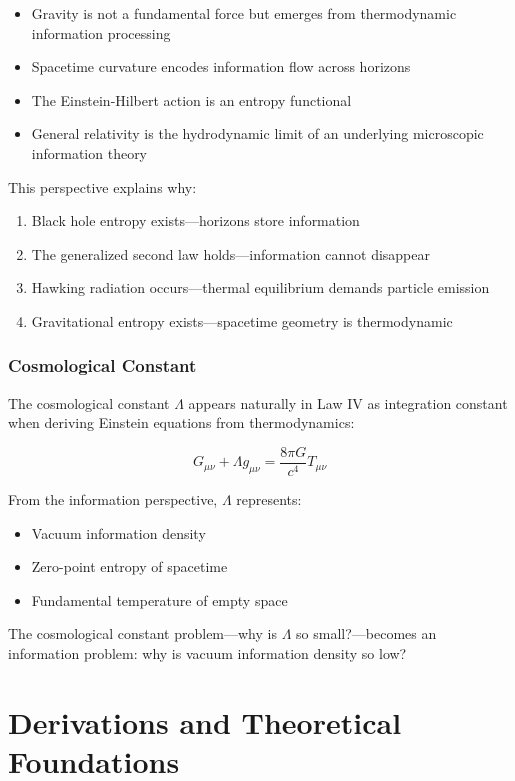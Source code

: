 \documentclass[11pt,a4paper]{article}
\theoremstyle{plain}
\theoremstyle{definition}
\theoremstyle{remark}
\begin{document}
\begin{itemize}[leftmargin=*]
\item Gravity is not a fundamental force but emerges from thermodynamic information processing
\item Spacetime curvature encodes information flow across horizons
\item The Einstein-Hilbert action is an entropy functional
\item General relativity is the hydrodynamic limit of an underlying microscopic information theory
\end{itemize}

This perspective explains why:
\begin{enumerate}[leftmargin=*]
\item Black hole entropy exists—horizons store information
\item The generalized second law holds—information cannot disappear
\item Hawking radiation occurs—thermal equilibrium demands particle emission
\item Gravitational entropy exists—spacetime geometry is thermodynamic
\end{enumerate}

\subsubsection{Cosmological Constant}

The cosmological constant $\Lambda$ appears naturally in Law IV as integration constant when deriving Einstein equations from thermodynamics:

\begin{equation}
G_{\mu\nu} + \Lambda g_{\mu\nu} = \frac{8\pi G}{c^4}T_{\mu\nu}
\end{equation}

From the information perspective, $\Lambda$ represents:
\begin{itemize}[leftmargin=*]
\item Vacuum information density
\item Zero-point entropy of spacetime
\item Fundamental temperature of empty space
\end{itemize}

The cosmological constant problem—why is $\Lambda$ so small?—becomes an information problem: why is vacuum information density so low?

\section{Derivations and Theoretical Foundations}
\label{sec:derivations}
\end{document}
